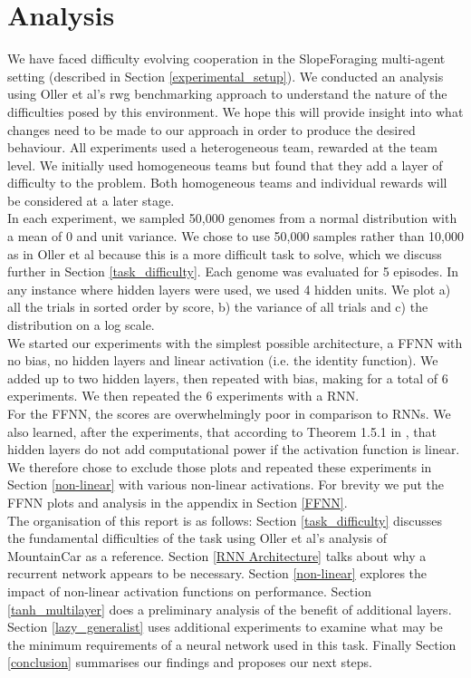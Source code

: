 \documentclass[12pt]{article}
\begin{document}
\section{Analysis}
		
We have faced difficulty evolving cooperation in the SlopeForaging multi-agent setting (described in Section \ref{experimental_setup}). 
We conducted an analysis using Oller et al's rwg benchmarking approach \cite{oller:AAMAS:2020} to understand the nature of the difficulties posed by this environment. 
We hope this will provide insight into what changes need to be made to our approach in order to produce the desired behaviour. 
All experiments used a heterogeneous team, rewarded at the team level. 
We initially used homogeneous teams but found that they add a layer of difficulty to the problem.
Both homogeneous teams and individual rewards will be considered at a later stage.\\

In each experiment, we sampled 50,000 genomes from a normal distribution with a mean of 0 and unit variance.
We chose to use 50,000 samples rather than 10,000 as in Oller et al because this is a more difficult task to solve, which we discuss further in Section \ref{task_difficulty}.
Each genome was evaluated for 5 episodes. 
In any instance where hidden layers were used, we used 4 hidden units. 
We plot a) all the trials in sorted order by score, b) the variance of all trials and c) the distribution on a log scale.\\

We started our experiments with the simplest possible architecture, a FFNN with no bias, no hidden layers and linear activation (i.e. the identity function). 
We added up to two hidden layers, then repeated with bias, making for a total of 6 experiments. 
We then repeated the 6 experiments with a RNN. \\

For the FFNN, the scores are overwhelmingly poor in comparison to RNNs. 
We also learned, after the experiments, that according to Theorem 1.5.1 in \cite{aggarwal:Springer:2018}, that hidden layers do not add computational power if the activation function is linear. 
We therefore chose to exclude those plots and repeated these experiments in Section \ref{non-linear} with various non-linear activations.
For brevity we put the FFNN plots and analysis in the appendix in Section \ref{FFNN}. \\

The organisation of this report is as follows: 
Section \ref{task_difficulty} discusses the fundamental difficulties of the task using Oller et al's analysis of MountainCar \cite{MountainCar} as a reference. 
Section \ref{RNN Architecture} talks about why a recurrent network appears to be necessary. 
Section \ref{non-linear} explores the impact of non-linear activation functions on performance. 
Section \ref{tanh_multilayer} does a preliminary analysis of the benefit of additional layers. 
Section \ref{lazy_generalist} uses additional experiments to examine what may be the minimum requirements of a neural network used in this task. 
Finally Section \ref{conclusion} summarises our findings and proposes our next steps. \\ 
\end{document}
